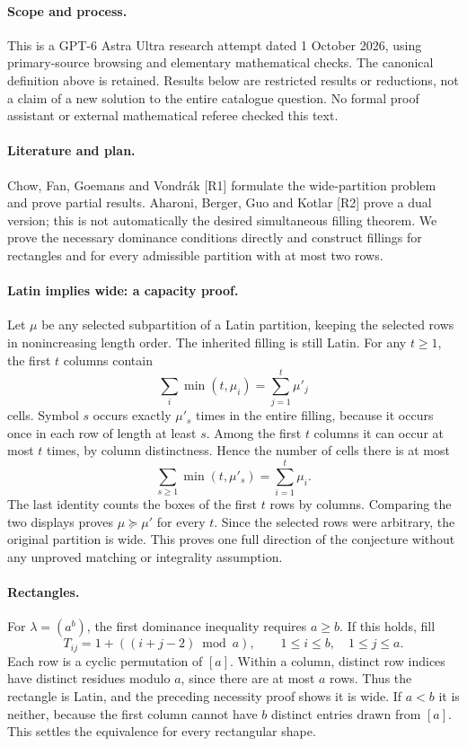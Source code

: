 \documentclass[11pt,a4paper]{article}
\begin{document}
\paragraph{Scope and process.}
This is a GPT-6 Astra Ultra research attempt dated 1 October 2026, using
primary-source browsing and elementary mathematical checks. The canonical
definition above is retained. Results below are restricted results or
reductions, not a claim of a new solution to the entire catalogue question.
No formal proof assistant or external mathematical referee checked this text.


\paragraph{Literature and plan.}
Chow, Fan, Goemans and Vondr\'ak [R1] formulate the wide-partition
problem and prove partial results. Aharoni, Berger, Guo and Kotlar
[R2] prove a dual version; this is not automatically the desired
simultaneous filling theorem. We prove the necessary dominance
conditions directly and construct fillings for rectangles and for
every admissible partition with at most two rows.

\paragraph{Latin implies wide: a capacity proof.}
Let $\mu$ be any selected subpartition of a Latin partition, keeping
the selected rows in nonincreasing length order. The inherited filling
is still Latin. For any $t\ge1$, the first $t$ columns contain
\[
 \sum_i\min(t,\mu_i)=\sum_{j=1}^t\mu'_j
\]
cells. Symbol $s$ occurs exactly $\mu'_s$ times in the entire filling,
because it occurs once in each row of length at least $s$. Among the
first $t$ columns it can occur at most $t$ times, by column
distinctness. Hence the number of cells there is at most
\[
 \sum_{s\ge1}\min(t,\mu'_s)=\sum_{i=1}^t\mu_i.
\]
The last identity counts the boxes of the first $t$ rows by columns.
Comparing the two displays proves $\mu\succeq\mu'$ for every $t$.
Since the selected rows were arbitrary, the original partition is wide.
This proves one full direction of the conjecture without any unproved
matching or integrality assumption.

\paragraph{Rectangles.}
For $\lambda=(a^b)$, the first dominance inequality requires
$a\ge b$. If this holds, fill
\[
 T_{ij}=1+((i+j-2)\bmod a),\qquad 1\le i\le b,\quad1\le j\le a.
\]
Each row is a cyclic permutation of $[a]$. Within a column, distinct
row indices have distinct residues modulo $a$, since there are at
most $a$ rows. Thus the rectangle is Latin, and the preceding
necessity proof shows it is wide. If $a<b$ it is neither, because
the first column cannot have $b$ distinct entries drawn from $[a]$.
This settles the equivalence for every rectangular shape.
\end{document}
